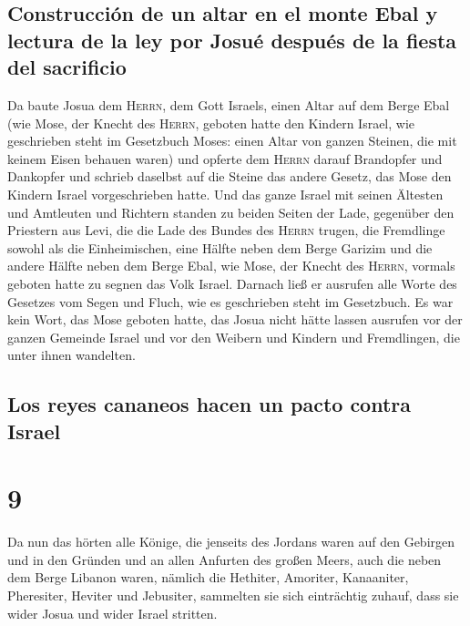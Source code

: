 \hypertarget{construcciuxf3n-de-un-altar-en-el-monte-ebal-y-lectura-de-la-ley-por-josuuxe9-despuuxe9s-de-la-fiesta-del-sacrificio}{%
\subsection{Construcción de un altar en el monte Ebal y lectura de la
ley por Josué después de la fiesta del
sacrificio}\label{construcciuxf3n-de-un-altar-en-el-monte-ebal-y-lectura-de-la-ley-por-josuuxe9-despuuxe9s-de-la-fiesta-del-sacrificio}}

 Da baute Josua dem \textsc{Herrn}, dem Gott Israels,
einen Altar auf dem Berge Ebal  (wie Mose, der Knecht des
\textsc{Herrn}, geboten hatte den Kindern Israel, wie geschrieben steht
im Gesetzbuch Moses: einen Altar von ganzen Steinen, die mit keinem
Eisen behauen waren) und opferte dem \textsc{Herrn} darauf Brandopfer
und Dankopfer  und schrieb daselbst auf die Steine das
andere Gesetz, das Mose den Kindern Israel vorgeschrieben hatte.
 Und das ganze Israel mit seinen Ältesten und Amtleuten
und Richtern standen zu beiden Seiten der Lade, gegenüber den Priestern
aus Levi, die die Lade des Bundes des \textsc{Herrn} trugen, die
Fremdlinge sowohl als die Einheimischen, eine Hälfte neben dem Berge
Garizim und die andere Hälfte neben dem Berge Ebal, wie Mose, der Knecht
des \textsc{Herrn}, vormals geboten hatte zu segnen das Volk Israel.
 Darnach ließ er ausrufen alle Worte des Gesetzes vom
Segen und Fluch, wie es geschrieben steht im Gesetzbuch. 
Es war kein Wort, das Mose geboten hatte, das Josua nicht hätte lassen
ausrufen vor der ganzen Gemeinde Israel und vor den Weibern und Kindern
und Fremdlingen, die unter ihnen wandelten.

\hypertarget{los-reyes-cananeos-hacen-un-pacto-contra-israel}{%
\subsection{Los reyes cananeos hacen un pacto contra
Israel}\label{los-reyes-cananeos-hacen-un-pacto-contra-israel}}

\hypertarget{section-8}{%
\section{9}\label{section-8}}

 Da nun das hörten alle Könige, die jenseits des Jordans
waren auf den Gebirgen und in den Gründen und an allen Anfurten des
großen Meers, auch die neben dem Berge Libanon waren, nämlich die
Hethiter, Amoriter, Kanaaniter, Pheresiter, Heviter und Jebusiter,
 sammelten sie sich einträchtig zuhauf, dass sie wider
Josua und wider Israel stritten.

